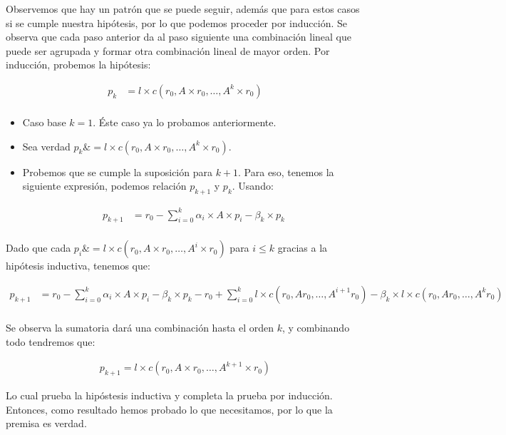 \begin{itemize}
    Observemos que hay un patrón que se puede seguir, además que para estos casos si se cumple nuestra hipótesis, por lo que podemos proceder por inducción. Se observa que cada paso anterior da al paso siguiente una combinación lineal que puede ser agrupada y formar otra combinación lineal de mayor orden.
    Por inducción, probemos la hipótesis:
    
    \begin{align*}
        p_k &= l \times c(r_0, A \times r_0, \ldots, A^k \times r_0) \\
    \end{align*}
    
    \begin{itemize}
        \item Caso base $k=1$. Éste caso ya lo probamos anteriormente.
        \item Sea verdad $p_k \&= l \times c(r_0, A \times r_0, \ldots, A^k \times r_0)$.
        \item Probemos que se cumple la suposición para $k+1$. Para eso, tenemos la siguiente expresión, podemos relación $p_{k+1}$ y $p_k$. Usando:
        
        \begin{align*}
            p_{k+1} &= r_0 - \sum_{i=0}^{k} \alpha_i \times A \times p_i - \beta_k \times p_k \\
        \end{align*}
    \end{itemize}
    
    Dado que cada $p_i \&= l \times c(r_0, A \times r_0, \ldots, A^i \times r_0)$ para $i \leq k$ gracias a la hipótesis inductiva, tenemos que:
    
    \begin{align*}
        p_{k+1} &= r_0 - \sum_{i=0}^{k} \alpha_i \times A \times p_i - \beta_k \times p_k - r_0 + \sum_{i=0}^{k} l \times c (r_0, Ar_0, \ldots, A^{i+1}r_0) - \beta_k \times l \times c (r_0, Ar_0, \ldots, A^k r_0) \\
    \end{align*}
    
    Se observa la sumatoria dará una combinación hasta el orden $k$, y combinando todo tendremos que:
    
    \begin{align*}
        p_{k+1} = l \times c (r_0, A \times r_0, \ldots, A^{k+1} \times r_0)
    \end{align*}
    
    Lo cual prueba la hipóstesis inductiva y completa la prueba por inducción. Entonces, como resultado hemos probado lo que necesitamos, por lo que la premisa es verdad.
    

\end{itemize}
